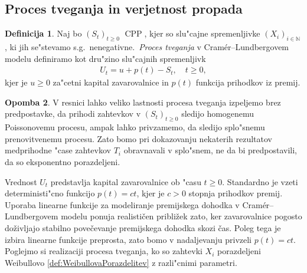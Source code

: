 \documentclass[12pt, a4paper, reqno]{amsart}
\theoremstyle{definition}
\newtheorem{definicija}{Definicija}[section]
\newtheorem{opomba}[definicija]{Opomba}
\theoremstyle{plain}
\newcommand{\N}{\mathbb{N}}
\newcommand{\1}{\mathds{1}}
\DeclareMathOperator{\CPP}{CPP}
\newcommand*{\refPriloga}[1]{%
  \begingroup
    \hypersetup{
      linkcolor=red,
      linkbordercolor=red,
    }%
    \ref{#1}%
  \endgroup
}
\begin{document}
    \subsection{Proces tveganja in verjetnost propada}

        \begin{definicija}
            Naj bo $(S_t)_{t\geq0 }$ $\CPP$, kjer so slu"cajne spremenljivke $(X_i)_{i\in\N}$, 
            ki jih se"stevamo s.g.\ nenegativne.\ \textit{Proces tveganja} v Cramér--Lundbergovem 
            modelu definiramo kot dru"zino slu"cajnih spremenljivk 
            \begin{align*}
                U_t = u + p(t) - S_t, \quad t\geq0,
            \end{align*}
            kjer je $u \geq 0$ za"cetni kapital zavarovalnice in $p(t)$ funkcija prihodkov iz premij. 
            \label{def:procesTveganja}
        \end{definicija}

        \begin{opomba}
            V resnici lahko veliko lastnosti procesa tveganja izpeljemo brez predpostavke, da prihodi 
            zahtevkov v $(S_t)_{t\geq0}$ sledijo homogenemu Poissonovemu procesu,
            ampak lahko privzamemo, da sledijo splo"snemu prenovitvenemu procesu. 
            Zato bomo pri dokazovanju nekaterih rezultatov medprihodne "case zahtevkov $T_i$ obravnavali v 
            splo"snem, ne da bi predpostavili, da so eksponentno porazdeljeni.
            \label{op:procesTveganja}
        \end{opomba}

        Vrednost $U_t$ predstavlja kapital zavarovalnice ob "casu $t\geq0$. Standardno je  
        vzeti deterministi"cno funkcijo $p(t) = ct$, kjer je $c>0$ stopnja prihodkov premij.
        Uporaba linearne funkcije za modeliranje premijskega dohodka v Cramér--Lundbergovem 
        modelu ponuja realističen približek zato, ker zavarovalnice pogosto doživljajo 
        stabilno povečevanje premijskega dohodka skozi čas. Poleg tega je izbira linearne 
        funkcije preprosta, zato bomo v nadaljevanju privzeli $p(t) = ct$. Poglejmo si 
        realizaciji procesa tveganja, ko so zahtevki $X_i$ porazdeljeni Weibullovo 
        \refPriloga{def:WeibullovaPorazdelitev} z razli"cnimi parametri. 
\end{document}
